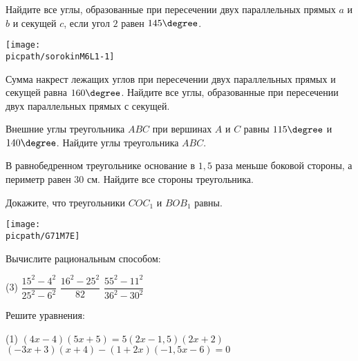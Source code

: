 \begin{exam}
	\begin{listofex}
		\item
		\begin{minipage}[t]{\linewidth}
			Найдите все углы, образованные при пересечении двух параллельных прямых \(a\) и \(b\) и секущей \(c\), если угол \(2\) равен \(145 \degree\).
		\end{minipage}
		\hspace{0.02\linewidth}
		\begin{minipage}[c]{0.9\linewidth}
			\texttt{[image: \\picpath/sorokinM6L1-1]}
		\end{minipage}
		\item Сумма накрест лежащих углов при пересечении двух параллельных прямых и секущей равна \(160 \degree \). Найдите все углы, образованные при пересечении двух параллельных прямых с секущей.
		\item Внешние углы треугольника \(ABC\) при вершинах \(A\) и \(C\) равны \(115\degree\) и \(140\degree \). Найдите углы треугольника \(ABC\).
		\item В равнобедренном треугольнике основание в \(1,5\) раза меньше боковой стороны, а периметр равен \(30\) см. Найдите все стороны треугольника.
		\item 
		\begin{minipage}[t]{\bodywidth}
			Докажите, что треугольники \(COC_1\) и \( BOB_1 \) равны.
		\end{minipage}
		\hspace{0.02\linewidth}
		\begin{minipage}[t]{\picwidth}
			\texttt{[image: \\picpath/G71M7E]}
		\end{minipage}
		\item Вычислите рациональным способом:
		\begin{tasks}(3)
			\task \( \dfrac{ 15^2-4^2 }{ 25^2-6^2 } \)
			\task \( \dfrac{ 16^2-25^2 }{ 82 } \)
			\task \( \dfrac{ 55^2-11^2 }{ 36^2-30^2 } \)
		\end{tasks}
		\item Решите уравнения:
		\begin{tasks}(1)
			\task \( (4x-4)(5x+5)=5(2x-1,5)(2x+2) \)
			\task \( (-3x+3)(x+4) - (1+2x)(-1,5x-6)=0 \)
		\end{tasks}
	\end{listofex}
\end{exam}
